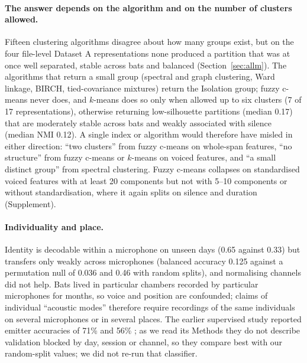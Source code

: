 \paragraph{The answer depends on the algorithm and on the number of clusters allowed.} Fifteen clustering algorithms disagree about how many groups exist, but on the four file-level Dataset A representations none produced a partition that was at once well separated, stable across bats and balanced (Section~\ref{sec:allm}). The algorithms that return a small group (spectral and graph clustering, Ward linkage, BIRCH, tied-covariance mixtures) return the Isolation group; fuzzy c-means never does, and $k$-means does so only when allowed up to six clusters (7 of 17 representations), otherwise returning low-silhouette partitions (median 0.17) that are moderately stable across bats and weakly associated with silence (median NMI 0.12). A single index or algorithm would therefore have misled in either direction: ``two clusters'' from fuzzy c-means on whole-span features, ``no structure'' from fuzzy c-means or $k$-means on voiced features, and ``a small distinct group'' from spectral clustering. Fuzzy c-means collapses on standardised voiced features with at least 20 components but not with 5--10 components or without standardisation, where it again splits on silence and duration (Supplement).

\paragraph{Individuality and place.} Identity is decodable within a microphone on unseen days (0.65 against 0.33) but transfers only weakly across microphones (balanced accuracy 0.125 against a permutation null of 0.036 and 0.46 with random splits), and normalising channels did not help. Bats lived in particular chambers recorded by particular microphones for months, so voice and position are confounded; claims of individual ``acoustic modes'' therefore require recordings of the same individuals on several microphones or in several places. The earlier supervised study reported emitter accuracies of 71\% and 56\% \cite{prat2016}; as we read its Methods they do not describe validation blocked by day, session or channel, so they compare best with our random-split values; we did not re-run that classifier.

